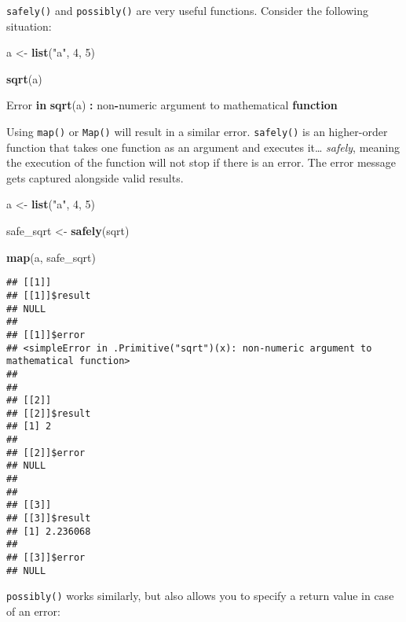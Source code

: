 \documentclass[
]{article}
\newenvironment{Shaded}{\begin{snugshade}}{\end{snugshade}}
\newcommand{\ControlFlowTok}[1]{\textcolor[rgb]{0.13,0.29,0.53}{\textbf{#1}}}
\newcommand{\DecValTok}[1]{\textcolor[rgb]{0.00,0.00,0.81}{#1}}
\newcommand{\KeywordTok}[1]{\textcolor[rgb]{0.13,0.29,0.53}{\textbf{#1}}}
\newcommand{\NormalTok}[1]{#1}
\newcommand{\OperatorTok}[1]{\textcolor[rgb]{0.81,0.36,0.00}{\textbf{#1}}}
\newcommand{\StringTok}[1]{\textcolor[rgb]{0.31,0.60,0.02}{#1}}
\begin{document}
\texttt{safely()} and \texttt{possibly()} are very useful functions. Consider the following situation:

\begin{Shaded}
\begin{Highlighting}[]
\NormalTok{a \textless{}{-}}\StringTok{ }\KeywordTok{list}\NormalTok{(}\StringTok{"a"}\NormalTok{, }\DecValTok{4}\NormalTok{, }\DecValTok{5}\NormalTok{)}

\KeywordTok{sqrt}\NormalTok{(a)}
\end{Highlighting}
\end{Shaded}

\begin{Shaded}
\begin{Highlighting}[]
\NormalTok{Error }\ControlFlowTok{in} \KeywordTok{sqrt}\NormalTok{(a) }\OperatorTok{:}\StringTok{ }\NormalTok{non}\OperatorTok{{-}}\NormalTok{numeric argument to mathematical }\ControlFlowTok{function}
\end{Highlighting}
\end{Shaded}

Using \texttt{map()} or \texttt{Map()} will result in a similar error. \texttt{safely()} is an higher-order function that
takes one function as an argument and executes it\ldots{} \emph{safely}, meaning the execution of the function
will not stop if there is an error. The error message gets captured alongside valid results.

\begin{Shaded}
\begin{Highlighting}[]
\NormalTok{a \textless{}{-}}\StringTok{ }\KeywordTok{list}\NormalTok{(}\StringTok{"a"}\NormalTok{, }\DecValTok{4}\NormalTok{, }\DecValTok{5}\NormalTok{)}

\NormalTok{safe\_sqrt \textless{}{-}}\StringTok{ }\KeywordTok{safely}\NormalTok{(sqrt)}

\KeywordTok{map}\NormalTok{(a, safe\_sqrt)}
\end{Highlighting}
\end{Shaded}

\begin{verbatim}
## [[1]]
## [[1]]$result
## NULL
## 
## [[1]]$error
## <simpleError in .Primitive("sqrt")(x): non-numeric argument to mathematical function>
## 
## 
## [[2]]
## [[2]]$result
## [1] 2
## 
## [[2]]$error
## NULL
## 
## 
## [[3]]
## [[3]]$result
## [1] 2.236068
## 
## [[3]]$error
## NULL
\end{verbatim}

\texttt{possibly()} works similarly, but also allows you to specify a return value in case of an error:
\end{document}
